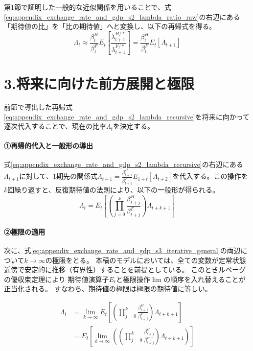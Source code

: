 第1節で証明した一般的な近似関係を用いることで、式\eqref{eq:appendix_exchange_rate_and_gdp_s2_lambda_ratio_raw}の右辺にある「期待値の比」を「比の期待値」へと変換し、以下の再帰式を得る。
\begin{equation}
    \Lambda_t\approx\frac{\beta_t^H}{\beta_t^F}E_t\left[\frac{\lambda_{t+1}^{H/*}}{\lambda_{t+1}^{F/*}}\right]=\frac{\beta_t^H}{\beta_t^F}E_t[\Lambda_{t+1}]
    \label{eq:appendix_exchange_rate_and_gdp_s2_lambda_recursive}
\end{equation}

\section*{3.将来に向けた前方展開と極限}
\label{sec:appendix_exchange_rate_and_gdp_s3}

前節で導出した再帰式\eqref{eq:appendix_exchange_rate_and_gdp_s2_lambda_recursive}を将来に向かって逐次代入することで、現在の比率\(\Lambda_t\)を決定する。

\paragraph{①再帰的代入と一般形の導出}
\label{sec:appendix_exchange_rate_and_gdp_s3_p1}
式\eqref{eq:appendix_exchange_rate_and_gdp_s2_lambda_recursive}の右辺にある\(\Lambda_{t+1}\)に対して、1期先の関係式\(\Lambda_{t+1}=\frac{\beta_{t+1}^H}{\beta_{t+1}^F}E_{1+t}[\Lambda_{t+2}]\)を代入する。この操作を\(k\)回繰り返すと、反復期待値の法則により、以下の一般形が得られる。
\begin{equation}
    \Lambda_t=E_t\left[\left(\prod_{j=0}^{k}\frac{\beta_{t+j}^H}{\beta_{t+j}^F}\right)\Lambda_{t+k+1}\right]
    \label{eq:appendix_exchange_rate_and_gdp_s3_iterative_general}
\end{equation}

\paragraph{②極限の適用}
\label{sec:appendix_exchange_rate_and_gdp_s3_p2}
次に、式\eqref{eq:appendix_exchange_rate_and_gdp_s3_iterative_general}の両辺について\(k\to\infty\)の極限をとる。
本稿のモデルにおいては、全ての変数が定常状態近傍で安定的に推移（有界性）することを前提としている。
このときルベーグの優収束定理により
期待値演算子\(E_t\)と極限操作\(\lim\)の順序を入れ替えることが正当化される。
すなわち、期待値の極限は極限の期待値に等しい。

\begin{align}
    \Lambda_t&=\lim_{k\to\infty}E_t\left[\left(\prod_{j=0}^{k}\frac{\beta_{t+j}^H}{\beta_{t+j}^F}\right)\Lambda_{t+k+1}\right] \nonumber \\
    &=E_t\left[\lim_{k\to\infty}\left(\left(\prod_{j=0}^{k}\frac{\beta_{t+j}^H}{\beta_{t+j}^F}\right)\Lambda_{t+k+1}\right)\right]
    \label{eq:appendix_exchange_rate_and_gdp_s3_limit_exchange}
\end{align}

